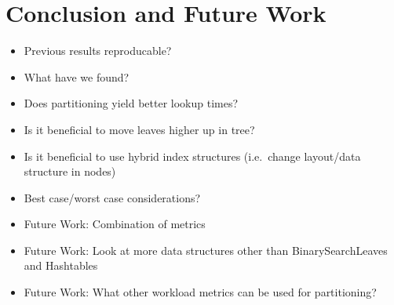 \chapter{Conclusion and Future Work}

\begin{itemize}
    \item Previous results reproducable?
    \item What have we found?
    \item Does partitioning yield better lookup times?
    \item Is it beneficial to move leaves higher up in tree?
    \item Is it beneficial to use hybrid index structures (i.e.~change layout/data structure in nodes)
    \item Best case/worst case considerations?
    \item Future Work: Combination of metrics
    \item Future Work: Look at more data structures other than BinarySearchLeaves and Hashtables
    \item Future Work: What other workload metrics can be used for partitioning?
\end{itemize}